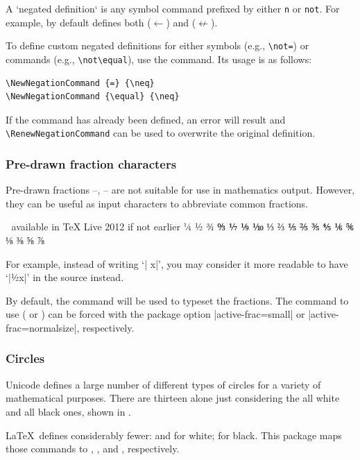 A `negated definition` is any symbol command prefixed by either \verb|n| or \verb|not|. For example,  by default defines both  ($\leftarrow$) and  ($\nleftarrow$).

To define custom negated definitions for either symbols (e.g., \verb|\not=|) or commands (e.g., \verb|\not\equal|), use the  command. Its usage is as follows:
\begin{verbatim}
\NewNegationCommand {=} {\neq}
\NewNegationCommand {\equal} {\neq}
\end{verbatim}
If the command has already been defined, an error will result and \verb|\RenewNegationCommand| can be used to overwrite the original definition.


\subsubsection{Pre-drawn fraction characters}

Pre-drawn fractions --, --
are not suitable for use in mathematics output. However, they can be useful
as input characters to abbreviate common fractions.
\begin{center}
 ^^A available in TeX Live 2012 if not earlier
¼ ½ ¾  ↉ ⅐ ⅑ ⅒ ⅓ ⅔ ⅕ ⅖ ⅗ ⅘ ⅙ ⅚ ⅛ ⅜ ⅝ ⅞
\end{center}
For example, instead of writing `| x|', you may consider it more readable to have
`|½x|' in the source instead.

By default, the  command will be used to typeset the fractions.
The command to use ( or ) can be forced with the package
option |active-frac=small| or |active-frac=normalsize|, respectively.

\subsubsection{Circles}

Unicode defines a large number of different types of circles for a variety
of mathematical purposes. There are thirteen alone just considering the
all white and all black ones, shown in .

\LaTeX\ defines considerably fewer:  and  for white;
 for black. This package maps those commands to ,
, and , respectively.

